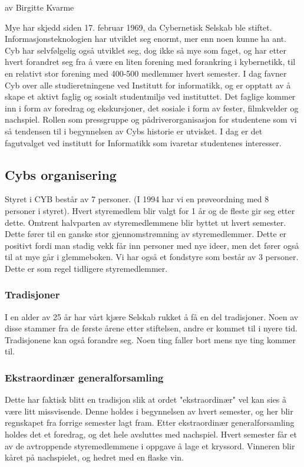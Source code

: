 \documentclass[../main.tex]{subfiles}
\begin{document}
av Birgitte Kvarme

Mye har skjedd siden 17. februar 1969, da Cybernetisk Selskab ble stiftet. Informasjonsteknologien har utviklet seg enormt, mer enn noen kunne ha ant. Cyb har selvfølgelig også utviklet seg, dog ikke så mye som faget, og har etter hvert forandret seg fra å være en liten forening med forankring i kybernetikk, til en relativt stor forening med 400-500 medlemmer hvert semester. I dag favner Cyb over alle studieretningene ved Institutt for informatikk, og er opptatt av å skape et aktivt faglig og sosialt studentmiljø ved instituttet. Det faglige kommer inn i form av foredrag og ekskursjoner, det sosiale i form av fester, filmkvelder og nachspiel. Rollen som pressgruppe og pådriverorganisasjon for studentene som vi så tendensen til i begynnelsen av Cybs historie er utvisket. I dag er det fagutvalget ved institutt for Informatikk som ivaretar studentenes interesser.

\subsection{Cybs organisering}
Styret i CYB består av 7 personer. (I 1994 har vi en prøveordning med 8 personer i styret). Hvert styremedlem blir valgt for 1 år og de fleste gir seg etter dette. Omtrent halvparten av styremedlemmene blir byttet ut hvert semester. Dette fører til en ganske stor gjennomstrømning av styremedlemmer. Dette er positivt fordi man stadig vekk får inn personer med nye ideer, men det fører også til at mye går i glemmeboken. Vi har også et fondstyre som består av 3 personer. Dette er som regel tidligere styremedlemmer.

\subsubsection{Tradisjoner}
I en alder av 25 år har vårt kjære Selskab rukket å få en del tradisjoner. Noen av disse stammer fra de første årene etter stiftelsen, andre er kommet til i nyere tid. Tradisjonene kan også forandre seg. Noen ting faller bort mens nye ting kommer til.


\subsubsection{Ekstraordinær generalforsamling}
Dette har faktisk blitt en tradisjon slik at ordet "ekstraordinær" vel kan sies å være litt missvisende. Denne holdes i begynnelsen av hvert semester, og her blir regnskapet fra forrige semester lagt fram. Etter ekstraordinær generalforsamling holdes det et foredrag, og det hele avsluttes med nachspiel. Hvert semester får et av de avtroppende styremedlemmene i oppgave å lage et kryssord. Vinneren blir kåret på nachspielet, og hedret med en flaske vin.
\end{document}
